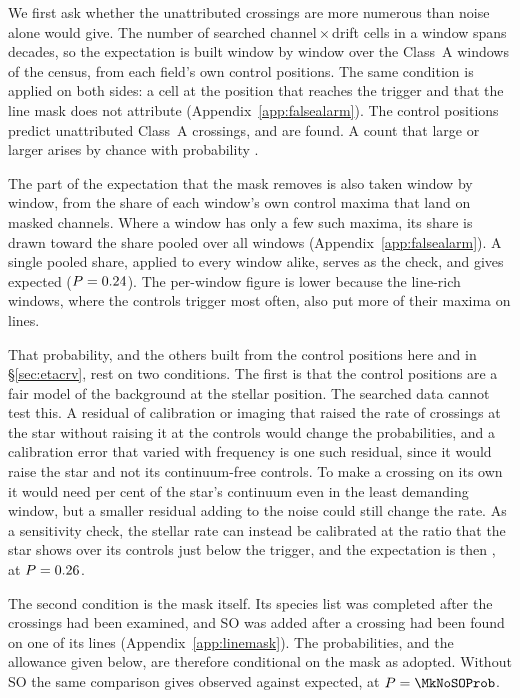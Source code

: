We first ask whether the unattributed crossings are more numerous than
noise alone would give. The number of searched channel\,$\times$\,drift
cells in a window spans \TuCellsDecades{} decades, so the expectation is
built window by window over the \CeNWin{} Class~A windows of the census,
from each field's own control positions. The same condition is applied on
both sides: a cell at the position that reaches the trigger and that the
line mask does not attribute (Appendix~\ref{app:falsealarm}). The control
positions predict \CeExp{} unattributed Class~A crossings, and \CeObs{} are
found. A count that large or larger arises by chance with probability
\CeProbNull.

The part of the expectation that the mask removes is also taken window by
window, from the share of each window's own control maxima that land on
masked channels. Where a window has only a few such maxima, its share is
drawn toward the share pooled over all windows (Appendix~\ref{app:falsealarm}).
A single pooled share, applied to every window alike, serves as the check,
and gives \CeExpPool{} expected ($P=0.24$). The per-window figure
is \CeExpMovePool{} lower because the line-rich windows, where the controls
trigger most often, also put more of their maxima on lines.

That probability, and the others built from the control positions here and
in \S\ref{sec:etacrv}, rest on two conditions. The first is that the control
positions are a fair model of the background at the stellar position. The
searched data cannot test this. A residual of calibration or imaging that
raised the rate of crossings at the star without raising it at the controls
would change the probabilities, and a calibration error that varied with
frequency is one such residual, since it would raise the star and not its
continuum-free controls. To make a crossing on its own it would need
\CyEpsMinPct{} per cent of the star's continuum even in the least demanding
window, but a smaller residual adding to the noise could still change the
rate. As a sensitivity check, the stellar rate can instead be calibrated at
the ratio \CeNear{} that the star shows over its controls just below the
trigger, and the expectation is then \CeExpNear{}, at $P=0.26$.

The second condition is the mask itself. Its species list was completed
after the crossings had been examined, and SO was added after a crossing had
been found on one of its lines (Appendix~\ref{app:linemask}). The
probabilities, and the allowance given below, are therefore conditional on
the mask as adopted. Without SO the same comparison gives \MkNoSOObs{}
observed against \MkNoSOExp{} expected, at $P=\MkNoSOProb$.

